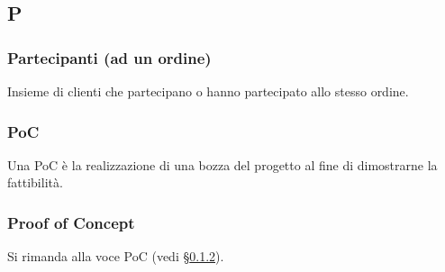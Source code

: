 \subsection{P}

\subsubsection{Partecipanti (ad un ordine)}
Insieme di clienti che partecipano o hanno partecipato allo stesso ordine.

\subsubsection{PoC}
\label{poc}
Una PoC è la realizzazione di una bozza del progetto al fine di dimostrarne la fattibilità.

\subsubsection{Proof of Concept}
Si rimanda alla voce PoC (vedi \S\ref{poc}).
